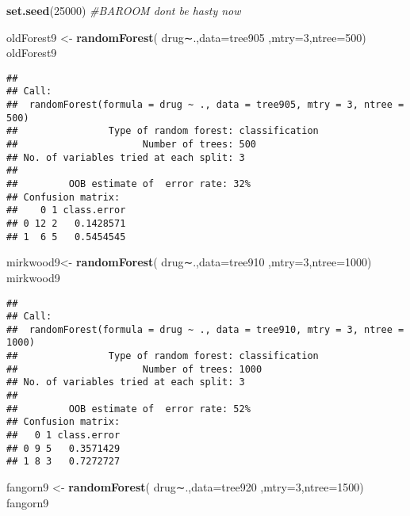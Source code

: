 \documentclass[]{article}
\newenvironment{Shaded}{\begin{snugshade}}{\end{snugshade}}
\newcommand{\KeywordTok}[1]{\textcolor[rgb]{0.13,0.29,0.53}{\textbf{#1}}}
\newcommand{\DataTypeTok}[1]{\textcolor[rgb]{0.13,0.29,0.53}{#1}}
\newcommand{\DecValTok}[1]{\textcolor[rgb]{0.00,0.00,0.81}{#1}}
\newcommand{\StringTok}[1]{\textcolor[rgb]{0.31,0.60,0.02}{#1}}
\newcommand{\CommentTok}[1]{\textcolor[rgb]{0.56,0.35,0.01}{\textit{#1}}}
\newcommand{\NormalTok}[1]{#1}
\begin{document}
\begin{Shaded}
\begin{Highlighting}[]
\KeywordTok{set.seed}\NormalTok{(}\DecValTok{25000}\NormalTok{)}
\CommentTok{#BAROOM dont be hasty now}

\NormalTok{oldForest9 <-}\StringTok{ }\KeywordTok{randomForest}\NormalTok{( drug∼.,}\DataTypeTok{data=}\NormalTok{tree905  ,}\DataTypeTok{mtry=}\DecValTok{3}\NormalTok{,}\DataTypeTok{ntree=}\DecValTok{500}\NormalTok{)}
\NormalTok{oldForest9}
\end{Highlighting}
\end{Shaded}

\begin{verbatim}
## 
## Call:
##  randomForest(formula = drug ~ ., data = tree905, mtry = 3, ntree = 500) 
##                Type of random forest: classification
##                      Number of trees: 500
## No. of variables tried at each split: 3
## 
##         OOB estimate of  error rate: 32%
## Confusion matrix:
##    0 1 class.error
## 0 12 2   0.1428571
## 1  6 5   0.5454545
\end{verbatim}

\begin{Shaded}
\begin{Highlighting}[]
\NormalTok{mirkwood9<-}\StringTok{ }\KeywordTok{randomForest}\NormalTok{( drug∼.,}\DataTypeTok{data=}\NormalTok{tree910  ,}\DataTypeTok{mtry=}\DecValTok{3}\NormalTok{,}\DataTypeTok{ntree=}\DecValTok{1000}\NormalTok{)}
\NormalTok{mirkwood9}
\end{Highlighting}
\end{Shaded}

\begin{verbatim}
## 
## Call:
##  randomForest(formula = drug ~ ., data = tree910, mtry = 3, ntree = 1000) 
##                Type of random forest: classification
##                      Number of trees: 1000
## No. of variables tried at each split: 3
## 
##         OOB estimate of  error rate: 52%
## Confusion matrix:
##   0 1 class.error
## 0 9 5   0.3571429
## 1 8 3   0.7272727
\end{verbatim}

\begin{Shaded}
\begin{Highlighting}[]
\NormalTok{fangorn9 <-}\StringTok{ }\KeywordTok{randomForest}\NormalTok{( drug∼.,}\DataTypeTok{data=}\NormalTok{tree920  ,}\DataTypeTok{mtry=}\DecValTok{3}\NormalTok{,}\DataTypeTok{ntree=}\DecValTok{1500}\NormalTok{)}
\NormalTok{fangorn9}
\end{Highlighting}
\end{Shaded}
\end{document}
